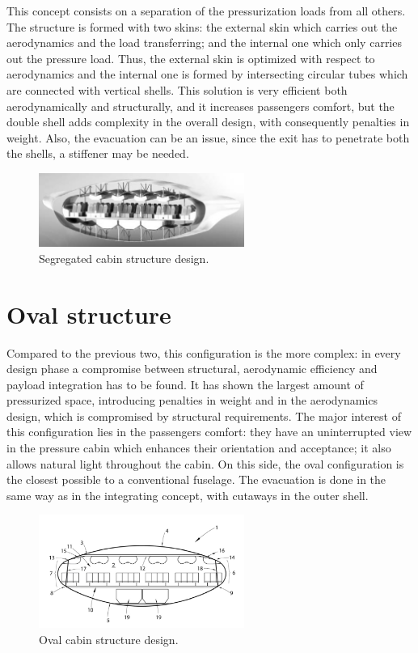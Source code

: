 This concept consists on a separation of the pressurization loads from all others. 
The structure is formed with two skins: the external skin which carries out the aerodynamics and the load transferring; and the internal one which only carries out the pressure load. Thus, the external skin is optimized with respect to aerodynamics and the internal one is formed by intersecting circular tubes which are connected with vertical shells. 
This solution is very efficient both aerodynamically and structurally, and it increases passengers comfort, but the double shell adds complexity in the overall design, with consequently penalties in weight. 
Also, the evacuation can be an issue, since the exit has to penetrate both the shells, a stiffener may be needed. 
\begin{figure}[h!]
	\centering
	\includegraphics[keepaspectratio, width=0.6\textwidth]{images/app_bwb_cab/segregated_structure.jpg}
	\caption{Segregated cabin structure design.}
	\label{fig:bwb_segregated}
\end{figure}

\section{Oval structure}
\label{sec:app1_oval_struct}

Compared to the previous two, this configuration is the more complex: in every design phase a compromise between structural, aerodynamic efficiency and payload integration has to be found. It has shown the largest amount of pressurized space, introducing penalties in weight and in the aerodynamics design, which is compromised by structural requirements. 
The major interest of this configuration lies in the passengers comfort: they have an uninterrupted view in the pressure cabin which enhances their orientation and acceptance; it also allows natural light throughout the cabin. On this side, the oval configuration is the closest possible to a conventional fuselage. 
The evacuation is done in the same way as in the integrating concept, with cutaways in the outer shell. 
\begin{figure}[h!]
	\centering
	\includegraphics[keepaspectratio, width=0.6\textwidth]{images/app_bwb_cab/oval_structure.jpg}
	\caption{Oval cabin structure design.}
	\label{fig:bwb_oval}
\end{figure}
